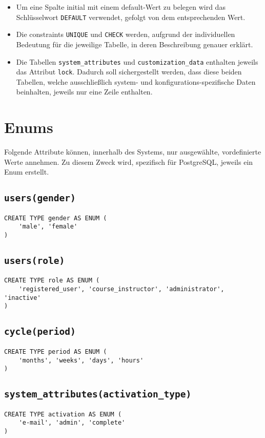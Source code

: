 \begin{itemize}
\item Um eine Spalte initial mit einem default-Wert zu belegen wird das Schlüsselwort \texttt{DEFAULT} verwendet, gefolgt von dem entsprechenden Wert.

\item Die constraints \texttt{UNIQUE} und \texttt{CHECK} werden, aufgrund der individuellen Bedeutung für die jeweilige Tabelle, in deren Beschreibung genauer erklärt.

\item Die Tabellen \texttt{system\_attributes} und \texttt{customization\_data} enthalten jeweils das Attribut \texttt{lock}. Dadurch soll sichergestellt werden, dass diese beiden Tabellen, welche ausschließlich system- und konfigurations-spezifische Daten beinhalten, jeweils nur eine Zeile enthalten.
\end{itemize}

\section{Enums}
Folgende Attribute können, innerhalb des Systems, nur ausgewählte, vordefinierte Werte annehmen. Zu diesem Zweck wird, spezifisch für PostgreSQL, jeweils ein Enum erstellt.

\subsection{\texttt{users(gender)}}

\begin{verbatim}
CREATE TYPE gender AS ENUM (
    'male', 'female'
)
\end{verbatim}

\subsection{\texttt{users(role)}}

\begin{verbatim}
CREATE TYPE role AS ENUM (
    'registered_user', 'course_instructor', 'administrator', 'inactive'
)
\end{verbatim}

\subsection{\texttt{cycle(period)}}

\begin{verbatim}
CREATE TYPE period AS ENUM (
    'months', 'weeks', 'days', 'hours'
)
\end{verbatim}

\subsection{\texttt{system\_attributes(activation\_type)}}

\begin{verbatim}
CREATE TYPE activation AS ENUM (
    'e-mail', 'admin', 'complete'
)
\end{verbatim}
